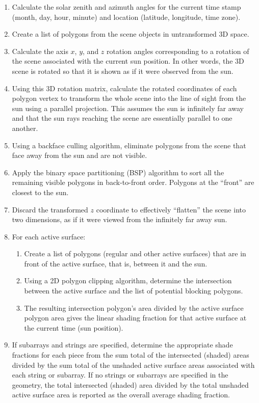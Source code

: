 \documentclass[twocolumn,10pt]{asme2ej}
\begin{document}
\begin{enumerate}
\item Calculate the solar zenith and azimuth angles for the current time stamp (month, day, hour, minute) and location (latitude, longitude, time zone).
\item Create a list of polygons from the scene objects in untransformed 3D space.
\item Calculate the axis $x$, $y$, and $z$ rotation angles corresponding to a rotation of the scene associated with the current sun position.  In other words, the 3D scene is rotated so that it is shown as if it were observed from the sun.
\item Using this 3D rotation matrix, calculate the rotated coordinates of each polygon vertex to transform the whole scene into the line of sight from the sun using a parallel projection.  This assumes the sun is infinitely far away and that the sun rays reaching the scene are essentially parallel to one another.
\item Using a backface culling algorithm, eliminate polygons from the scene that face away from the sun and are not visible.
\item Apply the binary space partitioning (BSP) algorithm to sort all the remaining visible polygons in back-to-front order.  Polygons at the ``front'' are closest to the sun.
\item Discard the transformed $z$ coordinate to effectively ``flatten'' the scene into two dimensions, as if it were viewed from the infinitely far away sun.
	\item For each active surface:
	\begin{enumerate}
	\item Create a list of polygons (regular and other active surfaces) that are in front of the active surface, that is, between it and the sun.
	\item Using a 2D polygon clipping algorithm, determine the intersection between the active surface and the list of potential blocking polygons.
	\item The resulting intersection polygon's area divided by the active surface polygon area gives the linear shading fraction for that active surface at the current time (sun position).
	\end{enumerate}
\item If subarrays and strings are specified, determine the appropriate shade fractions for each piece from the sum total of the intersected (shaded) areas divided by the sum total of the unshaded active surface areas associated with each string or subarray.   If no strings or subarrays are specified in the geometry, the total intersected (shaded) area divided by the total unshaded active surface area is reported as the overall average shading fraction.
\end{enumerate}
\end{document}
